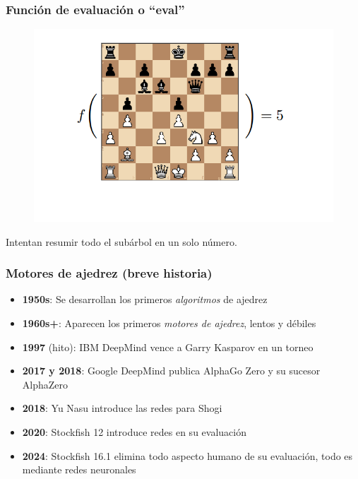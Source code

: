 \begin{frame}
\frametitle{Función de evaluación o \enquote{eval}}
\begin{figure}
    \centering
    \includegraphics[width=0.8\linewidth]{../assets/slides/eval.png}
\end{figure}
\begin{center}
Intentan resumir todo el subárbol en un solo número.
\end{center}
\end{frame}


\begin{frame}
\frametitle{Motores de ajedrez (breve historia)}
\begin{itemize}
    \item<1-> \textbf{1950s}: Se desarrollan los primeros \textit{algoritmos} de ajedrez
    \item<2-> \textbf{1960s+}: Aparecen los primeros \textit{motores de ajedrez}, lentos y débiles
    \item<3-> \textbf{1997} (hito): IBM DeepMind vence a Garry Kasparov en un torneo
    \item<4-> \textbf{2017 y 2018}: Google DeepMind publica AlphaGo Zero y su sucesor AlphaZero
    \item<5-> \textbf{2018}: Yu Nasu introduce las redes  para Shogi
    \item<6-> \textbf{2020}: Stockfish 12 introduce redes  en su evaluación
    \item<7-> \textbf{2024}: Stockfish 16.1 elimina todo aspecto humano de su evaluación, todo es mediante redes neuronales
\end{itemize}
\end{frame}

